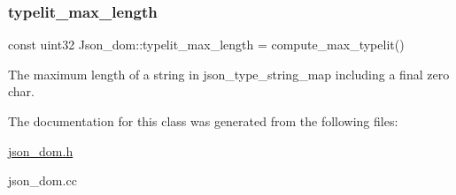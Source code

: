 \subsubsection{\texorpdfstring{typelit\+\_\+max\+\_\+length}{typelit\_max\_length}}
{\footnotesize\ttfamily const uint32 Json\+\_\+dom\+::typelit\+\_\+max\+\_\+length = compute\+\_\+max\+\_\+typelit()\hspace{0.3cm}{\ttfamily [static]}}

The maximum length of a string in json\+\_\+type\+\_\+string\+\_\+map including a final zero char. 

The documentation for this class was generated from the following files\+:\begin{DoxyCompactItemize}
\item 
\mbox{\hyperlink{json__dom_8h}{json\+\_\+dom.\+h}}\item 
json\+\_\+dom.\+cc\end{DoxyCompactItemize}
